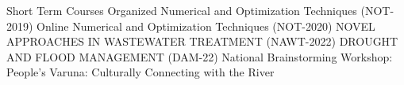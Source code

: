 \begin{rubric}{Short Term Courses Organized}
\entry*{} Numerical and Optimization Techniques (NOT-2019)
\entry*{} Online Numerical and Optimization Techniques (NOT-2020)
\entry*{} NOVEL APPROACHES IN WASTEWATER TREATMENT (NAWT-2022)
\entry*{} DROUGHT AND FLOOD MANAGEMENT (DAM-22)
\entry*{} National Brainstorming Workshop: People’s Varuna: Culturally Connecting with the River

\end{rubric}